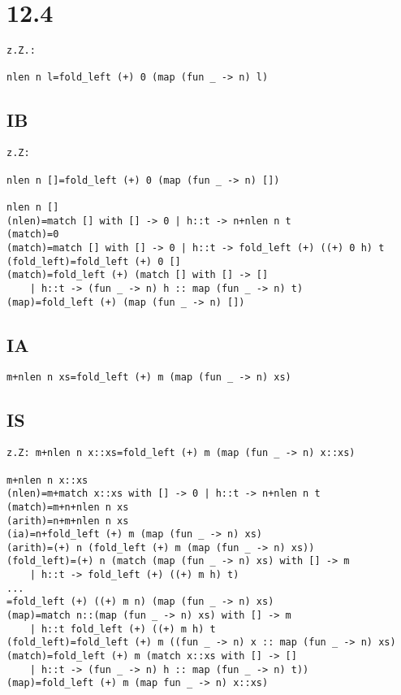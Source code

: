 \documentclass{article}
\begin{document}
\section*{12.4}

\begin{lstlisting}
z.Z.:

nlen n l=fold_left (+) 0 (map (fun _ -> n) l)
\end{lstlisting}

\subsection*{IB}

\begin{lstlisting}
z.Z:

nlen n []=fold_left (+) 0 (map (fun _ -> n) [])

nlen n []
(nlen)=match [] with [] -> 0 | h::t -> n+nlen n t
(match)=0
(match)=match [] with [] -> 0 | h::t -> fold_left (+) ((+) 0 h) t
(fold_left)=fold_left (+) 0 []
(match)=fold_left (+) (match [] with [] -> []
	| h::t -> (fun _ -> n) h :: map (fun _ -> n) t)
(map)=fold_left (+) (map (fun _ -> n) [])
\end{lstlisting}

\subsection*{IA}

\begin{lstlisting}
m+nlen n xs=fold_left (+) m (map (fun _ -> n) xs)
\end{lstlisting}

\subsection*{IS}

\begin{lstlisting}
z.Z: m+nlen n x::xs=fold_left (+) m (map (fun _ -> n) x::xs)

m+nlen n x::xs
(nlen)=m+match x::xs with [] -> 0 | h::t -> n+nlen n t
(match)=m+n+nlen n xs
(arith)=n+m+nlen n xs
(ia)=n+fold_left (+) m (map (fun _ -> n) xs)
(arith)=(+) n (fold_left (+) m (map (fun _ -> n) xs))
(fold_left)=(+) n (match (map (fun _ -> n) xs) with [] -> m
	| h::t -> fold_left (+) ((+) m h) t)
...
=fold_left (+) ((+) m n) (map (fun _ -> n) xs)
(map)=match n::(map (fun _ -> n) xs) with [] -> m
	| h::t fold_left (+) ((+) m h) t
(fold_left)=fold_left (+) m ((fun _ -> n) x :: map (fun _ -> n) xs)
(match)=fold_left (+) m (match x::xs with [] -> []
	| h::t -> (fun _ -> n) h :: map (fun _ -> n) t))
(map)=fold_left (+) m (map fun _ -> n) x::xs)
\end{lstlisting}
\end{document}
